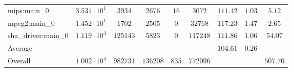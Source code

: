 \begin{tabular}{|l|c|c|c|c|c|c|c|c|}
mips:main\_0            & $ 3.531 \cdot 10^{1} $ & $ 3934   $ & $ 2676   $ & $ 16  $ & $ 3072   $ & $ 111.42      $ & $ 1.03    $ & $ 5.12    $ \\
mpeg2:main\_0           & $ 1.452 \cdot 10^{1} $ & $ 1702   $ & $ 2505   $ & $ 0   $ & $ 32768  $ & $ 117.23      $ & $ 1.47    $ & $ 2.65    $ \\
sha\_driver:main\_0     & $ 1.119 \cdot 10^{3} $ & $ 125143 $ & $ 5823   $ & $ 0   $ & $ 117248 $ & $ 111.86      $ & $ 1.06    $ & $ 54.07   $ \\
\hline
Average                 & $                    $ & $        $ & $        $ & $     $ & $        $ & $ 104.61      $ & $ 0.26    $ & $         $ \\
\hline
Overall                 & $ 1.002 \cdot 10^{4} $ & $ 982731 $ & $ 136208 $ & $ 835 $ & $ 772096 $ & $             $ & $         $ & $ 507.70  $ \\
\hline
\end{tabular}
